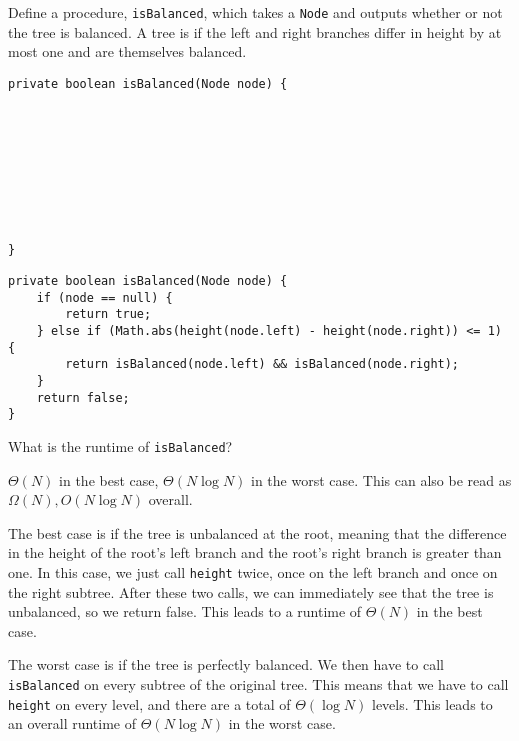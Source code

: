 \begin{blocksection}
\question Define a procedure, \lstinline$isBalanced$, which takes a
\lstinline$Node$ and outputs whether or not the tree is balanced. A tree is
 if the left and right branches differ in height by at most
one and are themselves balanced.

\ifprintanswers
\else
\begin{lstlisting}
private boolean isBalanced(Node node) {









}
\end{lstlisting}
\fi

\begin{solution}
\begin{lstlisting}
private boolean isBalanced(Node node) {
    if (node == null) {
        return true;
    } else if (Math.abs(height(node.left) - height(node.right)) <= 1) {
        return isBalanced(node.left) && isBalanced(node.right);
    }
    return false;
}
\end{lstlisting}
\end{solution}

What is the runtime of \lstinline$isBalanced$?
\begin{solution}[0.25in]
$\Theta(N)$ in the best case, $\Theta(N \log N)$ in the worst case.  This can
also be read as $\Omega(N), O(N \log N)$ overall.

The best case is if the tree is unbalanced at the root, meaning that the
difference in the height of the root's left branch and the root's right branch
is greater than one. In this case, we just call \lstinline$height$ twice, once
on the left branch and once on the right subtree. After these two calls, we can
immediately see that the tree is unbalanced, so we return false. This leads to
a runtime of $\Theta(N)$ in the best case.

The worst case is if the tree is perfectly balanced. We then have to call
\lstinline$isBalanced$ on every subtree of the original tree. This means that
we have to call \lstinline$height$ on every level, and there are a total of
$\Theta(\log N)$ levels. This leads to an overall runtime of $\Theta(N \log N)$
in the worst case.
\end{solution}
\end{blocksection}
